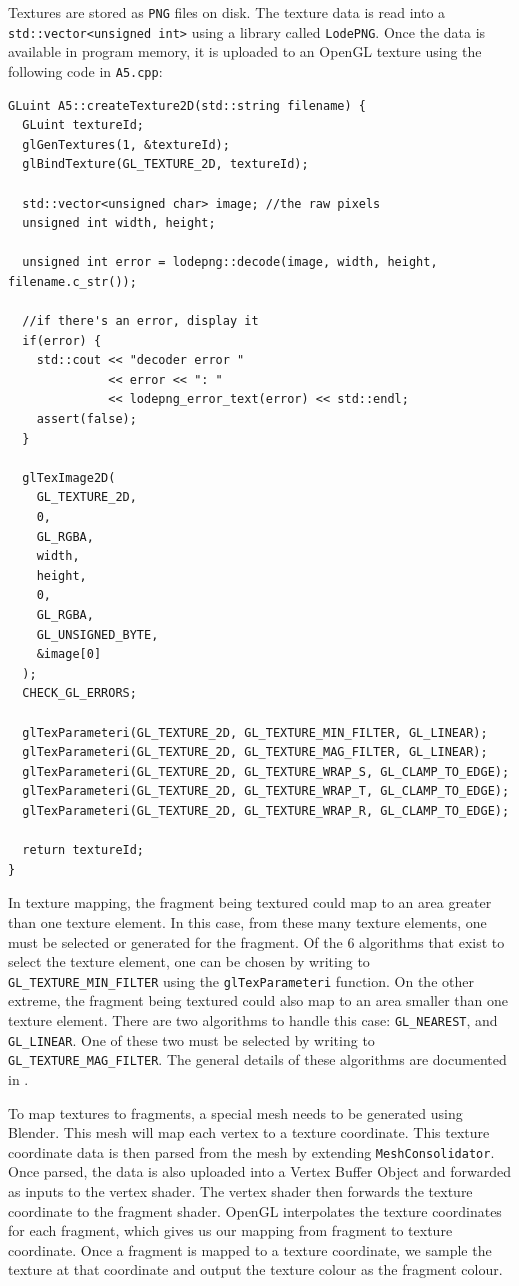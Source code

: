\documentclass[11pt]{report}
\begin{document}
Textures are stored as \verb|PNG| files on disk. The texture data is read into a \verb|std::vector<unsigned int>| using a library called \verb|LodePNG|. Once the data is available in program memory, it is uploaded to an OpenGL texture using the following code in \verb|A5.cpp|:

\begin{lstlisting}[caption={Read an image as a texture and upload to OpenGL memory.}]
GLuint A5::createTexture2D(std::string filename) {
  GLuint textureId;
  glGenTextures(1, &textureId);
  glBindTexture(GL_TEXTURE_2D, textureId);

  std::vector<unsigned char> image; //the raw pixels
  unsigned int width, height;

  unsigned int error = lodepng::decode(image, width, height, filename.c_str());

  //if there's an error, display it
  if(error) {
    std::cout << "decoder error "
              << error << ": "
              << lodepng_error_text(error) << std::endl;
    assert(false);
  }

  glTexImage2D(
    GL_TEXTURE_2D,
    0,
    GL_RGBA,
    width,
    height,
    0,
    GL_RGBA,
    GL_UNSIGNED_BYTE,
    &image[0]
  );
  CHECK_GL_ERRORS;

  glTexParameteri(GL_TEXTURE_2D, GL_TEXTURE_MIN_FILTER, GL_LINEAR);
  glTexParameteri(GL_TEXTURE_2D, GL_TEXTURE_MAG_FILTER, GL_LINEAR);
  glTexParameteri(GL_TEXTURE_2D, GL_TEXTURE_WRAP_S, GL_CLAMP_TO_EDGE);
  glTexParameteri(GL_TEXTURE_2D, GL_TEXTURE_WRAP_T, GL_CLAMP_TO_EDGE);
  glTexParameteri(GL_TEXTURE_2D, GL_TEXTURE_WRAP_R, GL_CLAMP_TO_EDGE);

  return textureId;
}
\end{lstlisting}

In texture mapping, the fragment being textured could map to an area greater than one texture element. In this case, from these many texture elements, one must be selected or generated for the fragment. Of the 6 algorithms that exist to select the texture element, one can be chosen by writing to \verb|GL_TEXTURE_MIN_FILTER| using the \verb|glTexParameteri| function. On the other extreme, the fragment being textured could also map to an area smaller than one texture element. There are two algorithms to handle this case: \verb|GL_NEAREST|, and \verb|GL_LINEAR|. One of these two must be selected by writing to \verb|GL_TEXTURE_MAG_FILTER|. The general details of these algorithms are documented in \cite{gl-tex-parameter}.

To map textures to fragments, a special mesh needs to be generated using Blender. This mesh will map each vertex to a texture coordinate. This texture coordinate data is then parsed from the mesh by extending \verb|MeshConsolidator|. Once parsed, the data is also uploaded into a Vertex Buffer Object and forwarded as inputs to the vertex shader. The vertex shader then forwards the texture coordinate to the fragment shader. OpenGL interpolates the texture coordinates for each fragment, which gives us our mapping from fragment to texture coordinate. Once a fragment is mapped to a texture coordinate, we sample the texture at that coordinate and output the texture colour as the fragment colour.
\end{document}
